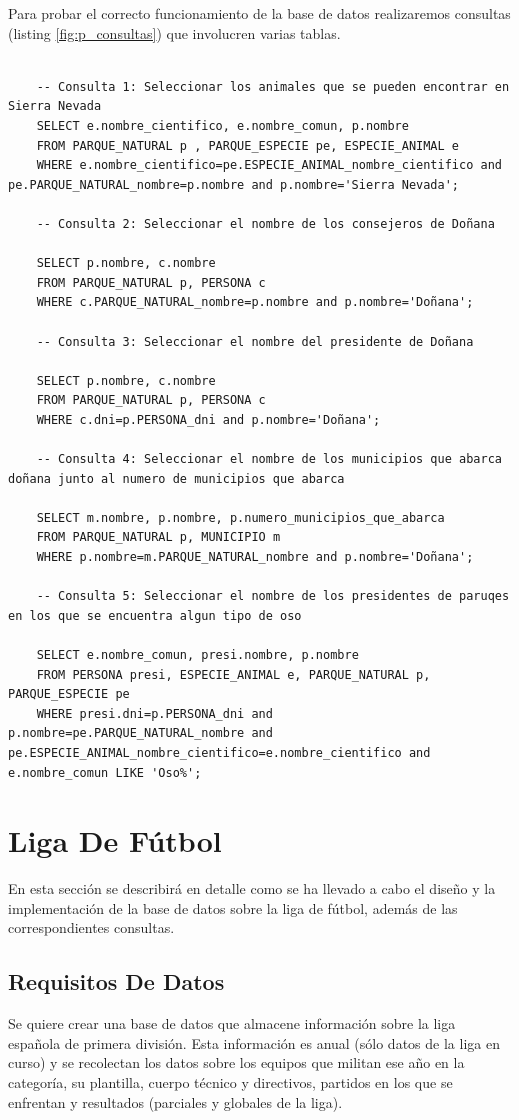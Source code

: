 \documentclass{article}
\begin{document}
Para probar el correcto funcionamiento de la base de datos realizaremos consultas (listing \ref{fig:p_consultas}) que involucren varias tablas.
\begin{lstlisting}[style=sqlstyle, label=fig:p_consultas,caption=Consultas Sobre Parques Naturales]
	
	-- Consulta 1: Seleccionar los animales que se pueden encontrar en Sierra Nevada
	SELECT e.nombre_cientifico, e.nombre_comun, p.nombre
	FROM PARQUE_NATURAL p , PARQUE_ESPECIE pe, ESPECIE_ANIMAL e
	WHERE e.nombre_cientifico=pe.ESPECIE_ANIMAL_nombre_cientifico and pe.PARQUE_NATURAL_nombre=p.nombre and p.nombre='Sierra Nevada';
	
	-- Consulta 2: Seleccionar el nombre de los consejeros de Doñana
	
	SELECT p.nombre, c.nombre
	FROM PARQUE_NATURAL p, PERSONA c
	WHERE c.PARQUE_NATURAL_nombre=p.nombre and p.nombre='Doñana';
	
	-- Consulta 3: Seleccionar el nombre del presidente de Doñana
	
	SELECT p.nombre, c.nombre
	FROM PARQUE_NATURAL p, PERSONA c
	WHERE c.dni=p.PERSONA_dni and p.nombre='Doñana';
	
	-- Consulta 4: Seleccionar el nombre de los municipios que abarca doñana junto al numero de municipios que abarca
	
	SELECT m.nombre, p.nombre, p.numero_municipios_que_abarca
	FROM PARQUE_NATURAL p, MUNICIPIO m
	WHERE p.nombre=m.PARQUE_NATURAL_nombre and p.nombre='Doñana';
	
	-- Consulta 5: Seleccionar el nombre de los presidentes de paruqes en los que se encuentra algun tipo de oso
	
	SELECT e.nombre_comun, presi.nombre, p.nombre
	FROM PERSONA presi, ESPECIE_ANIMAL e, PARQUE_NATURAL p, PARQUE_ESPECIE pe
	WHERE presi.dni=p.PERSONA_dni and p.nombre=pe.PARQUE_NATURAL_nombre and pe.ESPECIE_ANIMAL_nombre_cientifico=e.nombre_cientifico and e.nombre_comun LIKE 'Oso%';
  \end{lstlisting}

\newpage
\section{Liga De Fútbol}

En esta sección se describirá en detalle como se ha llevado a cabo el diseño y la implementación de la base de datos sobre la liga de fútbol, además de las correspondientes consultas.

\subsection{Requisitos De Datos}
Se quiere crear una base de datos que almacene información sobre la liga española de primera división. Esta información es anual (sólo datos de la liga en curso) y se recolectan los datos sobre los equipos que militan ese año en la categoría, su plantilla, cuerpo técnico y directivos, partidos en los que se enfrentan y resultados (parciales y globales de la liga). 
\\
\end{document}
